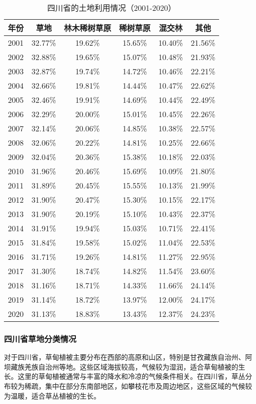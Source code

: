 \documentclass[AutoFakeBold]{LZUThesis-PgD&PhD}
\begin{document}
		
		\begin{table}[H]
			\centering
			\begin{tabular}{|c|c|c|c|c|c|}
				\hline
				年份 & 草地 & 林木稀树草原 & 稀树草原 & 混交林 & 其他 \\
				\hline
				2001 & 32.77\% & 19.62\% & 15.65\% & 10.40\% & 21.56\% \\
				2002 & 32.88\% & 19.65\% & 15.07\% & 10.48\% & 21.93\% \\
				2003 & 32.87\% & 19.74\% & 14.72\% & 10.46\% & 22.21\% \\
				2004 & 32.66\% & 19.81\% & 14.44\% & 10.47\% & 22.62\% \\
				2005 & 32.46\% & 19.91\% & 14.69\% & 10.44\% & 22.49\% \\
				2006 & 32.29\% & 20.00\% & 15.01\% & 10.45\% & 22.26\% \\
				2007 & 32.14\% & 20.06\% & 14.85\% & 10.38\% & 22.57\% \\
				2008 & 32.06\% & 20.22\% & 14.81\% & 10.25\% & 22.66\% \\
				2009 & 32.04\% & 20.36\% & 15.38\% & 10.18\% & 22.03\% \\
				2010 & 31.96\% & 20.46\% & 15.69\% & 10.09\% & 21.80\% \\
				2011 & 31.89\% & 20.45\% & 15.55\% & 10.13\% & 21.99\% \\
				2012 & 31.90\% & 20.47\% & 15.30\% & 10.15\% & 22.17\% \\
				2013 & 31.90\% & 20.19\% & 15.10\% & 10.43\% & 22.37\% \\
				2014 & 31.91\% & 19.94\% & 15.03\% & 10.71\% & 22.41\% \\
				2015 & 31.84\% & 19.58\% & 15.02\% & 11.04\% & 22.53\% \\
				2016 & 31.71\% & 19.26\% & 14.81\% & 11.27\% & 22.95\% \\
				2017 & 31.30\% & 18.74\% & 14.82\% & 11.54\% & 23.60\% \\
				2018 & 31.16\% & 18.71\% & 14.33\% & 11.66\% & 24.14\% \\
				2019 & 31.14\% & 18.72\% & 13.97\% & 12.00\% & 24.17\% \\
				2020 & 31.13\% & 18.83\% & 13.43\% & 12.37\% & 24.23\% \\
				\hline
			\end{tabular}
			\caption{四川省的土地利用情况（2001-2020）}
		\end{table}
    \subsubsection{四川省草地分类情况}
	\par 对于四川省，草甸植被主要分布在西部的高原和山区，特别是甘孜藏族自治州、阿坝藏族羌族自治州等地。这些区域海拔较高，气候较为湿润，适合草甸植被的生长。这里的草甸植被通常与丰富的降水和冷凉的气候条件相关。在四川省，草丛分布较为稀疏，集中在部分东南部地区，如攀枝花市及周边地区，这些区域的气候较为温暖，适合草丛植被的生长。
			 
\end{document}

